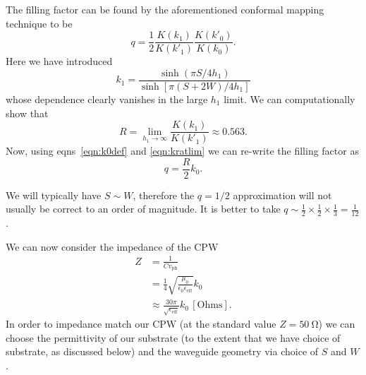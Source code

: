 The filling factor can be found by the aforementioned conformal mapping
technique to be~\cite{Simons2004}
\begin{equation}
  q = \frac{1}{2}\frac{K(k_1)}{K(k'_1)}\frac{K(k'_0)}{K(k_0)}.
  \label{eqn:fillfact}
\end{equation}
Here we have introduced
\begin{equation*}
  k_1 = \frac{\sinh (\pi S/ 4h_1)}{\sinh [\pi (S+2W)/4h_1]}
\end{equation*}
whose dependence clearly vanishes in the large $h_1$ limit. We can
computationally show that
\begin{equation}
  R = \lim_{h_1 \to \infty} \frac{K(k_1)}{K(k'_1)} \approx 0.563.
  \label{eqn:kratlim}
\end{equation}
Now, using eqns~\ref{eqn:k0def} and \ref{eqn:kratlim} we can re-write the
filling factor as
\begin{equation}
  q = \frac{R}{2}k_0.
\end{equation}

We will typically have $S\sim W$, therefore the $q=1/2$ approximation will  not
usually be correct to an order of magnitude. It is better to take $q\sim
\frac{1}{2} \times \frac{1}{2} \times \frac{1}{3} = \frac{1}{12}$.

We can now consider the impedance of the CPW~\cite{Simons2004}
\begin{align}
  Z &= \frac{1}{C v_\mathrm{ph}} \\
    &= \frac{1}{4}\sqrt{\frac{\mu_0}{\epsilon_0 \epsilon_\mathrm{eff}}}k_0 \\
    &\approx \frac{30\pi}{\sqrt{\epsilon_\mathrm{eff}}}k_0 \, \mathrm{[Ohms]}.
\end{align}
In order to impedance match our CPW (at the standard value $Z=\SI{50}{\ohm}$) we
can choose the permittivity of our substrate (to the extent that we have choice
of substrate, as discussed below) and the waveguide geometry via choice of $S$
and $W$.


